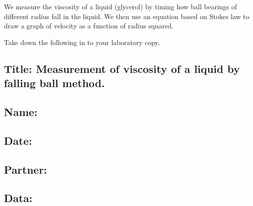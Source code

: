 \documentclass[
  letterpaper,
  DIV=11,
  numbers=noendperiod]{scrreprt}
\begin{document}
We measure the viscosity of a liquid (glycerol) by timing how ball
bearings of different radius fall in the liquid. We then use an equation
based on Stokes law to draw a graph of velocity as a function of radius
squared.

Take down the following in to your laboratory copy.

\subsection*{\texorpdfstring{{Title: Measurement of viscosity of a
liquid by falling ball
method.}}{Title: Measurement of viscosity of a liquid by falling ball method.}}\label{title-measurement-of-viscosity-of-a-liquid-by-falling-ball-method.}

\subsection*{\texorpdfstring{{Name:}}{Name:}}\label{name-1}

\subsection*{\texorpdfstring{{Date:}}{Date:}}\label{date-1}

\subsection*{\texorpdfstring{{Partner:}}{Partner:}}\label{partner-1}

\subsection*{\texorpdfstring{{Data:}}{Data:}}\label{data-1}
\end{document}
